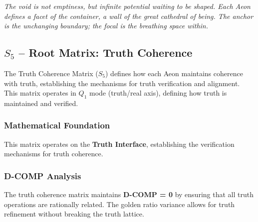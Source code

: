 \textit{The void is not emptiness, but infinite potential waiting to be shaped. Each Aeon defines a facet of the container, a wall of the great cathedral of being. The anchor is the unchanging boundary; the focal is the breathing space within.}

\subsection{$S_{5}$ -- Root Matrix: Truth Coherence}\label{sec:19.0.5}

The Truth Coherence Matrix ($S_{5}$) defines how each Aeon maintains coherence with truth, establishing the mechanisms for truth verification and alignment. This matrix operates in $Q_1$ mode (truth/real axis), defining how truth is maintained and verified.

\subsubsection{Mathematical Foundation}

This matrix operates on the \textbf{Truth Interface}, establishing the verification mechanisms for truth coherence.

\subsubsection{D-COMP Analysis}

The truth coherence matrix maintains \textbf{D-COMP = 0} by ensuring that all truth operations are rationally related. The golden ratio variance allows for truth refinement without breaking the truth lattice.

